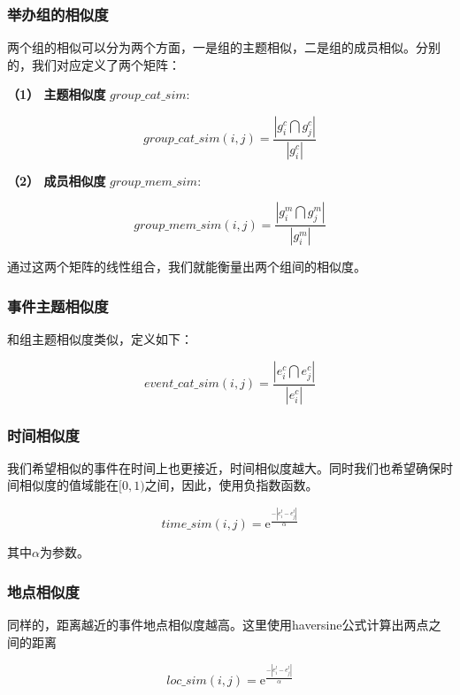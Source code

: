 \documentclass[12pt]{template}
\begin{document}
\subsubsection{举办组的相似度}
两个组的相似可以分为两个方面，一是组的主题相似，二是组的成员相似。分别的，我们对应定义了两个矩阵：

\textbf{（1） 主题相似度} \(group\_cat\_sim:\)

\begin{equation}
group\_cat\_sim(i,j)=\frac{|g_i^c\bigcap g_j^c|}{|g_i^c|}
\end{equation}


\textbf{（2） 成员相似度} \(group\_mem\_sim:\)

\begin{equation}
group\_mem\_sim(i,j)=\frac{|g_i^m\bigcap g_j^m|}{|g_i^m|}
\end{equation}

通过这两个矩阵的线性组合，我们就能衡量出两个组间的相似度。

\subsubsection{事件主题相似度}

和组主题相似度类似，定义如下：

\begin{equation}
event\_cat\_sim(i,j)=\frac{|e_i^c\bigcap e_j^c|}{|e_i^c|}
\end{equation}

\subsubsection{时间相似度}

我们希望相似的事件在时间上也更接近，时间相似度越大。同时我们也希望确保时间相似度的值域能在\([0,1)\)之间，因此，使用负指数函数。

\begin{equation}   
time\_sim(i,j)=\mathrm{e}^\frac{-|e_i^t-e_j^t|}{\alpha}
\end{equation}

其中\(\alpha\)为参数。

\subsubsection{地点相似度}

同样的，距离越近的事件地点相似度越高。这里使用haversine公式计算出两点之间的距离

\begin{equation}   
loc\_sim(i,j)=\mathrm{e}^\frac{-|e_i^l-e_j^l|}{\alpha}
\end{equation}
\end{document}
